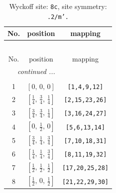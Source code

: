 \documentclass[fleqn,8pt]{jsarticle}
\begin{document}
\renewcommand{\arraystretch}{1.2}
\begin{longtable}{ccc}
\caption{Wyckoff site: {\tt 8c}, site symmetry: {\tt .2/m'.}}
 \\
 \hline \hline
No. & position & mapping \\ \hline \endfirsthead

\multicolumn{2}{l}{\tablename\ \thetable{}} \\
 \hline \hline
No. & position & mapping \\ \hline \endhead

 \hline \hline
\multicolumn{2}{r}{\footnotesize\it continued ...} \\ \endfoot

 \hline \hline
\multicolumn{2}{r}{} \\ \endlastfoot

1 & $\left[ 0,\, 0,\, 0 \right]$ & {\tt [1,4,9,12]} \\ \hline
2 & $\left[ \frac{1}{4},\, \frac{3}{4},\, \frac{1}{4} \right]$ & {\tt [2,15,23,26]} \\ \hline
3 & $\left[ \frac{3}{4},\, \frac{3}{4},\, \frac{1}{4} \right]$ & {\tt [3,16,24,27]} \\ \hline
4 & $\left[ 0,\, \frac{1}{2},\, 0 \right]$ & {\tt [5,6,13,14]} \\ \hline
5 & $\left[ \frac{3}{4},\, \frac{1}{4},\, \frac{3}{4} \right]$ & {\tt [7,10,18,31]} \\ \hline
6 & $\left[ \frac{1}{4},\, \frac{1}{4},\, \frac{3}{4} \right]$ & {\tt [8,11,19,32]} \\ \hline
7 & $\left[ \frac{1}{2},\, \frac{1}{2},\, \frac{1}{2} \right]$ & {\tt [17,20,25,28]} \\ \hline
8 & $\left[ \frac{1}{2},\, 0,\, \frac{1}{2} \right]$ & {\tt [21,22,29,30]} \\
\end{longtable}
\renewcommand{\arraystretch}{1.2}
\end{document}
